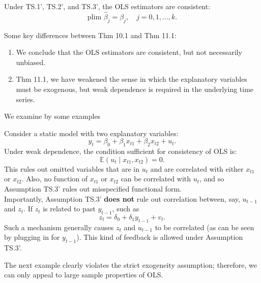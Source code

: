 \documentclass[a4paper, 10pt]{article}
\theoremstyle{definition}	%
\begin{document}
\begin{tcolorbox}[colback=blue!5!white, colframe=blue!80!black, title=Theorem 11.1 -- Consistency of OLS]
Under TS.1', TS.2', and TS.3', the OLS estimators are consistent: 
\[
\text{plim } \hat{\beta}_j = \beta_j, \quad j = 0, 1, \ldots, k.
\]
\end{tcolorbox}
Some key differences between Thm 10.1 and Thm 11.1:
\begin{enumerate}
    \item We conclude that the OLS estimators are consistent, but not necessarily unbiased.
    \item Thm 11.1, we have weakened the sense in which the explanatory variables must be exogenous, but weak dependence is required in the underlying time series.
\end{enumerate}
We examine by some examples
\begin{tcolorbox}[colback=gray!10!white, colframe=gray!40!black, title=Example 11.1 -- Static Model]
Consider a static model with two explanatory variables:
\[
y_t = \beta_0 + \beta_1 x_{t1} + \beta_2 x_{t2} + u_t.
\label{eq:7}
\]
Under weak dependence, the condition sufficient for consistency of OLS is:
\[
\mathbb{E}(u_t \mid x_{t1}, x_{t2}) = 0.
\label{eq:8}
\]
This rules out omitted variables that are in \( u_t \) and are correlated with either \( x_{t1} \) or \( x_{t2} \). Also, no function of \( x_{t1} \) or \( x_{t2} \) can be correlated with \( u_t \), and so Assumption TS.3' rules out misspecified functional form.\\
Importantly, Assumption TS.3' \textbf{does not} rule out correlation between, say, \( u_{t-1} \) and \( z_t \). If \( z_t \) is related to past \( y_{t-1} \), such as
\begin{equation}
z_t = \delta_0 + \delta_1 y_{t-1} + v_t.
\label{eq:9}
\end{equation}
Such a mechanism generally causes \( z_t \) and \( u_{t-1} \) to be correlated (as can be seen by plugging in for \( y_{t-1} \)). This kind of feedback is allowed under Assumption TS.3'.
\end{tcolorbox}

The next example clearly violates the strict exogeneity assumption; therefore, we can only appeal to large sample properties of OLS.
\end{document}

